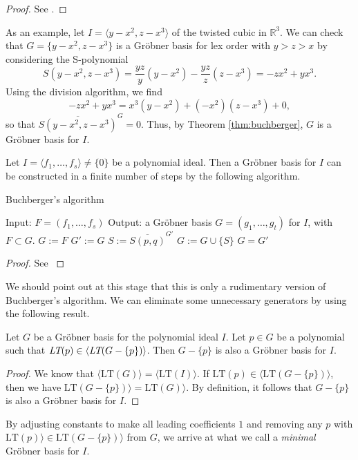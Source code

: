 \documentclass[english,bachelor]{liumaiex}
\begin{document}
\begin{proof}
See \cite[pp. 85-87]{cox}.
\end{proof}
As an example, let $I=\langle y-x^2,z-x^3\rangle$ of the twisted cubic in $\mathbb{R}^3$. We can check that $G=\{y-x^2,z-x^3\}$ is a Gröbner basis for lex order with $y>z>x$ by considering the S-polynomial
\begin{displaymath}
S(y-x^2,z-x^3)=\frac{yz}{y}(y-x^2)-\frac{yz}{z}(z-x^3)=-zx^2+yx^3.
\end{displaymath}
Using the division algorithm, we find
\begin{displaymath}
-zx^2+yx^3=x^3(y-x^2)+(-x^2)(z-x^3)+0,
\end{displaymath}
so that $\overline{S(y-x^2,z-x^3)}^G=0.$ Thus, by Theorem \ref{thm:buchberger}, $G$ is a Gröbner basis for $I$.

\begin{thm}
Let $I=\langle f_1,\dots,f_s\rangle \neq \{0\}$ be a polynomial ideal. Then a Gröbner basis for $I$ can be constructed in a finite number of steps by the following algorithm.

\begin{algorithm}
\caption{Buchberger's algorithm}\label{thm:buchbalg}
\begin{algorithmic}[1]
\State Input: $F=(f_1,\dots,f_s)$
\State Output: a Gröbner basis $G=(g_1,\dots,g_t)$ for $I$, with $F\subset G$.
\State $G:=F$
\Repeat
\State $G':=G$
	\State $S:=\overline{S(p,q)}^{G'}$
	\State $G:=G\cup \{S\}$
	\EndIf
\EndFor
\Until $G=G'$
\end{algorithmic}
\end{algorithm}
\end{thm}

\begin{proof}
See \cite[p. 90]{cox}
\end{proof}

We should point out at this stage that this is only a rudimentary version of Buchberger's algorithm. We can eliminate some unnecessary generators by using the following result.

\begin{lem}
Let $G$ be a Gröbner basis for the polynomial ideal $I$. Let $p\in G$ be a polynomial such that $\emph{LT}(p)\in\langle\emph{LT}(G-\{p\})\rangle$. Then $G-\{p\}$ is also a Gröbner basis for $I$.
\end{lem}

\begin{proof}
We know that $\langle\textrm{LT}(G)\rangle=\langle\textrm{LT}(I)\rangle$. If $\textrm{LT}(p)\in\langle\textrm{LT}(G-\{p\})\rangle$, then we have $\textrm{LT}(G-\{p\})\rangle=\textrm{LT}(G)\rangle$. By definition, it follows that $G-\{p\}$ is also a Gröbner basis for $I$.
\end{proof}
By adjusting constants to make all leading coefficients $1$ and removing any $p$ with $\textrm{LT}(p)\rangle\in\textrm{LT}(G-\{p\})\rangle$ from $G$, we arrive at what we call a \emph{minimal} Gröbner basis for $I$.
\end{document}
